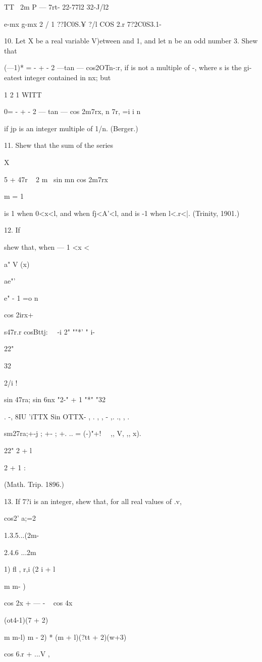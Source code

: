 {TT \ 2m P — 7rt- 22-77l2 32-J/l2

e-mx g-mx 2 / 1 ??IC0S.¥ ?/l COS 2.r 7?2C0S3.1- \

10. Let X be a real variable V)etween and 1, and let n be an odd
number 3. Shew that

(—1)* = - + - 2 —tan — cos2OTn-:r, if is not a multiple of -, where s
is the gi-eatest integer contained in nx; but

 1 2 1 WITT

0= - + - 2 — tan — cos 2m7rx, n 7r, =i i n

if jp is an integer multiple of 1/n. (Berger.)

11. Shew that the sum of the series

X

 5 + 47r ~ 2 m~ sin mn cos 2m7rx

m = 1

is 1 when 0<x<l, and when fj<A'<l, and is -1 when l<.r<|. (Trinity,
1901.)

12. If

shew that, when — 1 <x <\,

a" V (x)

ae"'

e" - 1 =o n

cos 2irx+

s47r.r cosBttj: \ \ -i 2" ""*' " i-

22"

32

2/i !

sin 47ra; sin 6nx "2-" + 1 "*" "32

. -, 8IU 'iTTX Sin OTTX- , . , , - ,. ., , .

sm27ra;+-j ; +- ; +. .. = (-)"+! \ \ ,, V, ,, x).

22" 2 + l

2 + 1 :

(Math. Trip. 1896.)

13. If 7?i is an integer, shew that, for all real values of .v,

cos2' a;=2

1.3.5...(2m-

2.4.6 ...2m

1) fl , r,i (2 i + l

m m- )

cos 2x + — - ~ cos 4x

(ot4-1)(7 + 2)

m m-l) m - 2) * (m + l)(?tt + 2)(w+3)

cos 6.r + ...V ,

}
